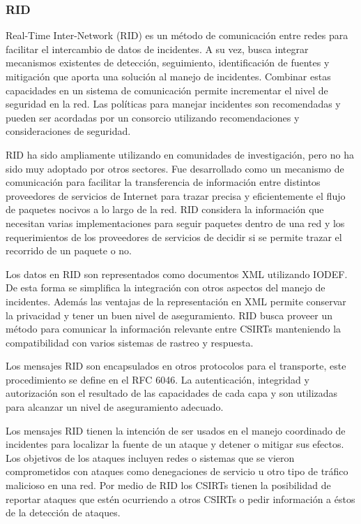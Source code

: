 \subsubsection{RID}

Real-Time Inter-Network (RID) es un método de comunicación entre redes para 
facilitar el intercambio de datos de incidentes. A su vez, busca integrar 
mecanismos existentes de detección, seguimiento, identificación de fuentes y 
mitigación que aporta una solución al manejo de incidentes. Combinar estas 
capacidades en un sistema de comunicación permite incrementar el nivel de 
seguridad en la red. Las políticas para manejar incidentes son recomendadas y 
pueden ser acordadas por un consorcio utilizando recomendaciones y 
consideraciones de seguridad.

RID ha sido ampliamente utilizando en comunidades de investigación, pero no ha 
sido muy adoptado por otros sectores. Fue desarrollado como un mecanismo de 
comunicación para facilitar la transferencia de información entre distintos 
proveedores de servicios de Internet para trazar precisa y eficientemente el 
flujo de paquetes nocivos a lo largo de la red. RID considera la información que 
necesitan varias implementaciones para seguir paquetes dentro de una red y los 
requerimientos de los proveedores de servicios de decidir si se permite trazar 
el recorrido de un paquete o no.

Los datos en RID son representados como documentos XML utilizando IODEF. De esta 
forma se simplifica la integración con otros aspectos del manejo de incidentes. 
Además las ventajas de la representación en XML permite conservar la privacidad 
y tener un buen nivel de aseguramiento. RID busca proveer un método para 
comunicar la información relevante entre CSIRTs manteniendo la compatibilidad 
con varios sistemas de rastreo y respuesta.

Los mensajes RID son encapsulados en otros protocolos para el transporte, este 
procedimiento se define en el RFC 6046. La autenticación, integridad y 
autorización son el resultado de las capacidades de cada capa y son utilizadas 
para alcanzar un nivel de aseguramiento adecuado.

Los mensajes RID tienen la intención de ser usados en el manejo coordinado de 
incidentes para localizar la fuente de un ataque y detener o mitigar sus 
efectos. Los objetivos de los ataques incluyen redes o sistemas que se vieron 
comprometidos con ataques como denegaciones de servicio u otro tipo de tráfico 
malicioso en una red. Por medio de RID los CSIRTs tienen la posibilidad de 
reportar ataques que estén ocurriendo a otros CSIRTs o pedir información a éstos 
de la detección de ataques.

